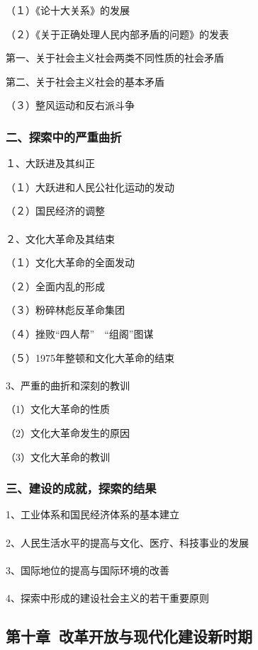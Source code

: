 \documentclass{ctexart}
\begin{document}
（１）《论十大关系》的发展

（２）《关于正确处理人民内部矛盾的问题》的发表

第一、关于社会主义社会两类不同性质的社会矛盾

第二、关于社会主义社会的基本矛盾

（３）整风运动和反右派斗争

\subsubsection{二、探索中的严重曲折}

１、大跃进及其纠正

（１）大跃进和人民公社化运动的发动

（２）国民经济的调整
\\\\

２、文化大革命及其结束

（１）文化大革命的全面发动

（２）全面内乱的形成

（３）粉碎林彪反革命集团

（４）挫败“四人帮”　“组阁”图谋

（５）1975年整顿和文化大革命的结束
\\\\

3、严重的曲折和深刻的教训

（1）文化大革命的性质

（2）文化大革命发生的原因

（3）文化大革命的教训

\subsubsection{三、建设的成就，探索的结果}

1、工业体系和国民经济体系的基本建立
\\\\

2、人民生活水平的提高与文化、医疗、科技事业的发展
\\\\

3、国际地位的提高与国际环境的改善
\\\\

4、探索中形成的建设社会主义的若干重要原则

\subsection{第十章\ 改革开放与现代化建设新时期}
\end{document}
